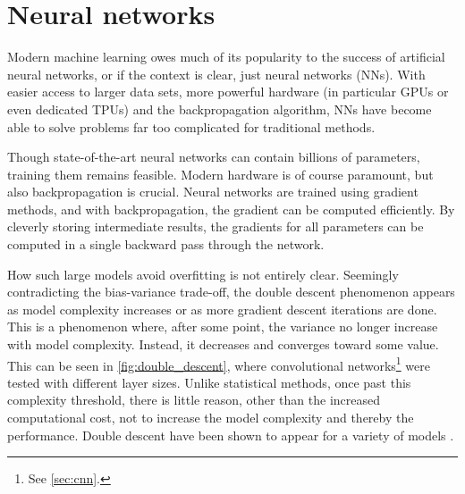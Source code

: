 \section{Neural networks}
\label{sec:nn}
Modern machine learning owes much of its popularity to the success of artificial neural networks, or if the context is clear, just neural networks (NNs).
With easier access to larger data sets, more powerful hardware (in particular GPUs or even dedicated TPUs) and the backpropagation algorithm, NNs have become able to solve problems far too complicated for traditional methods.

Though state-of-the-art neural networks can contain billions of parameters, training them remains feasible.
Modern hardware is of course paramount, but also backpropagation is crucial.
Neural networks are trained using gradient methods, and with backpropagation, the gradient can be computed efficiently.
By cleverly storing intermediate results, the gradients for all parameters can be computed in a single backward pass through the network.

How such large models avoid overfitting is not entirely clear.
Seemingly contradicting the bias-variance trade-off, the double descent phenomenon appears as model complexity increases or as more gradient descent iterations are done.
This is a phenomenon where, after some point, the variance no longer increase with model complexity.
Instead, it decreases and converges toward some value.
This can be seen in \cref{fig:double_descent}, where convolutional networks\footnote{See \cref{sec:cnn}.} were tested with different layer sizes.
Unlike statistical methods, once past this complexity threshold, there is little reason, other than the increased computational cost, not to increase the model complexity and thereby the performance.
Double descent have been shown to appear for a variety of models \cite{nakkiran2021}.

